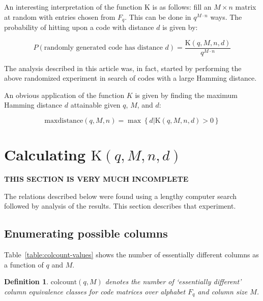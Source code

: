\documentclass[a4paper]{article}
\newcommand{\colcount}{\mathrm{colcount}}
\newcommand{\codecount}{\mathrm{K}}
\newcommand{\maxdistance}{\mathrm{maxdistance}}
\newtheorem{definition}{Definition}
\begin{document}
An interesting interpretation of the function $\codecount$ is as follows: fill an $M \times n$ matrix at random with entries chosen from $F_q$. This can be done in $q^{M \cdot n}$ ways.
The probability of hitting upon a code with distance $d$ is given by:

\begin{equation}
P(\mbox{randomly generated code has distance $d$}) = \frac{\codecount(q,M,n,d)}{q^{M \cdot n}}
\label{eq:probability}
\end{equation}

The analysis described in this article was, in fact, started by performing the above randomized experiment in search of codes with a large Hamming distance.

An obvious application of the function $K$ is given by finding the maximum Hamming distance $d$ attainable given $q$, $M$, and $d$:

\begin{equation}
\maxdistance(q,M,n) = \max \left\{ d | \codecount(q,M,n,d) > 0 \right\}
\label{eq:maxdistance}
\end{equation}

\section{Calculating $\codecount(q,M,n,d)$}
\label{sec:calculating-codecount}

\textbf{THIS SECTION IS VERY MUCH INCOMPLETE}

The relations described below were found using a lengthy computer search followed by analysis of the results. This section describes that experiment.

\subsection{Enumerating possible columns}

Table~\ref{table:colcount-values} shows the number of essentially different columns as a function of $q$ and $M$.

\begin{definition}
$\colcount(q,M)$ denotes the number of `essentially different' column equivalence classes for code matrices over alphabet $F_q$ and column size $M$.
\end{definition}
\end{document}
